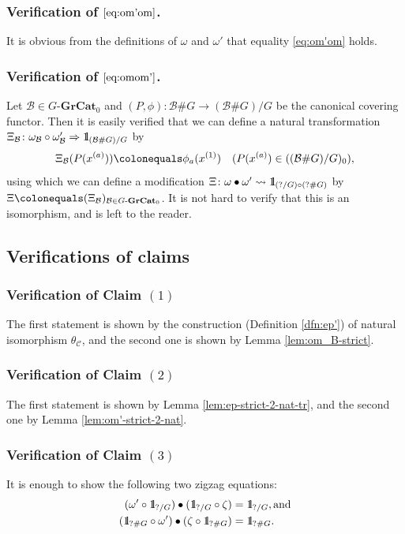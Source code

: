 \documentclass{surv-l}
\numberwithin{equation}{chapter}
\numberwithin{figure}{chapter}
\theoremstyle{plain}
\theoremstyle{definition}
\theoremstyle{remark}
\newcommand{\id}{1\kern-.25em{\text{{\rm l}}}}
\newcommand{\GGrCat}{G\text{-}\mathbf{GrCat}}
\begin{document}
\subsubsection*{Verification of $\protect\eqref{eq:om'om}$.}

It is obvious from the definitions of $\omega$ and $\omega'$
that equality \eqref{eq:om'om} holds.

\subsubsection*{Verification of $\protect\eqref{eq:omom'}$.}

Let $\mathcal{B}\in\GGrCat_0$ and
$(P,\phi)\colon\mathcal{B}\#G\to(\mathcal{B}\#G)/G$
be the canonical covering functor.
Then it is easily verified that we can define a natural transformation
$\Xi_\mathcal{B} \colon \omega_\mathcal{B} \circ \omega'_\mathcal{B} \Rightarrow \id_{(\mathcal{B}\#G)/G}$
by
\[
\Xi_{\mathcal{B}}(P(x^{(a)}))\colonequals \phi_{a}(x^{(1)}) \quad (P(x^{(a)})\in ((\mathcal{B}\#G)/G)_0),
\]
using which we can define a modification
$\Xi \colon \omega \bullet \omega' \leadsto \id_{(?/G)\circ (?\# G)}$
by $\Xi\colonequals  (\Xi_\mathcal{B})_{\mathcal{B} \in \GGrCat_0}$.
It is not hard to verify that this is an isomorphism, and is left to the reader.

\subsection{Verifications of claims}
\subsubsection*{Verification of Claim $(1)$}
The first statement is shown by the construction (Definition  \ref{dfn:ep'}) of
natural isomorphism $\theta_{\mathcal{C}}$, and the second one is shown by
Lemma  \ref{lem:om_B-strict}.

\subsubsection*{Verification of Claim $(2)$}
The first statement is shown by Lemma  \ref{lem:ep-strict-2-nat-tr}, and
the second one by Lemma \ref{lem:om'-strict-2-nat}.

\subsubsection*{Verification of Claim $(3)$}
It is enough to show the following two zigzag equations:
\begin{align}\label{eq:zigzag-thm1}
(\omega' \circ \id_{?/G}) \bullet (\id_{?/G} \circ \zeta) &= \id_{?/G}, \text{and}\\
\label{eq:zigzag-thm2}
(\id_{?\# G} \circ \omega') \bullet (\zeta \circ \id_{?\# G}) &= \id_{?\# G}.
\end{align}
\end{document}
